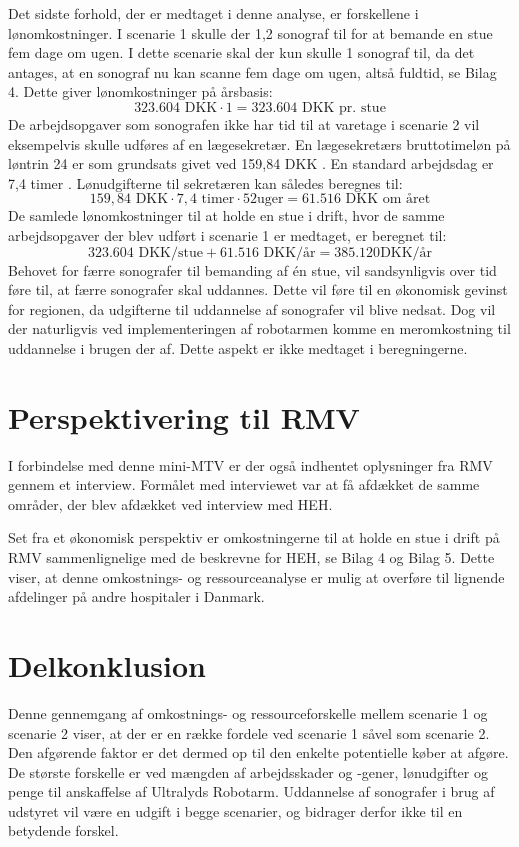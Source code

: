 Det sidste forhold, der er medtaget i denne analyse, er forskellene i lønomkostninger. I scenarie 1 skulle der 1,2 sonograf til for at bemande en stue fem dage om ugen. I dette scenarie skal der kun skulle 1 sonograf til, da det antages, at en sonograf nu kan scanne fem dage om ugen, altså fuldtid, se Bilag 4. Dette giver lønomkostninger på årsbasis:
\begin{equation}
323.604 \text{ DKK}\cdot1 = 323.604 \text{ DKK pr. stue}
\end{equation}
De arbejdsopgaver som sonografen ikke har tid til at varetage i scenarie 2 vil eksempelvis skulle udføres af en lægesekretær. En lægesekretærs bruttotimeløn på løntrin 24 er som grundsats givet ved 159,84 DKK \cite{Lontabel}. En standard arbejdsdag er 7,4 timer \cite{Arbejdstid}. Lønudgifterne til sekretæren kan således beregnes til:
\begin{equation}
159,84 \text{ DKK} \cdot 7,4 \text{ timer} \cdot 52 \text{uger} = 61.516 \text{ DKK om året}
\end{equation}
De samlede lønomkostninger til at holde en stue i drift, hvor de samme arbejdsopgaver der blev udført i scenarie 1 er medtaget, er beregnet til:
\begin{equation}
323.604 \text{ DKK/stue} + 61.516\text{ DKK/år} = 385.120 \text{DKK/år}
\end{equation}
Behovet for færre sonografer til bemanding af én stue, vil sandsynligvis over tid føre til, at færre sonografer skal uddannes. Dette vil føre til en økonomisk gevinst for regionen, da udgifterne til uddannelse af sonografer vil blive nedsat. Dog vil der naturligvis ved implementeringen af robotarmen komme en meromkostning til uddannelse i brugen der af. Dette aspekt er ikke medtaget i beregningerne. 

\section{Perspektivering til RMV}
I forbindelse med denne mini-MTV er der også indhentet oplysninger fra RMV gennem et interview. Formålet med interviewet var at få afdækket de samme områder, der blev afdækket ved interview med HEH. 

Set fra et økonomisk perspektiv er omkostningerne til at holde en stue i drift på RMV sammenlignelige med de beskrevne for HEH, se Bilag 4 og Bilag 5. Dette viser, at denne omkostnings- og ressourceanalyse er mulig at overføre til lignende afdelinger på andre hospitaler i Danmark.

\section{Delkonklusion}
Denne gennemgang af omkostnings- og ressourceforskelle mellem scenarie 1 og scenarie 2 viser, at der er en række fordele ved scenarie 1 såvel som scenarie 2. Den afgørende faktor er det dermed op til den enkelte potentielle køber at afgøre. De største forskelle er ved mængden af arbejdsskader og -gener, lønudgifter og penge til anskaffelse af Ultralyds Robotarm. Uddannelse af sonografer i brug af udstyret vil være en udgift i begge scenarier, og bidrager derfor ikke til en betydende forskel. 

